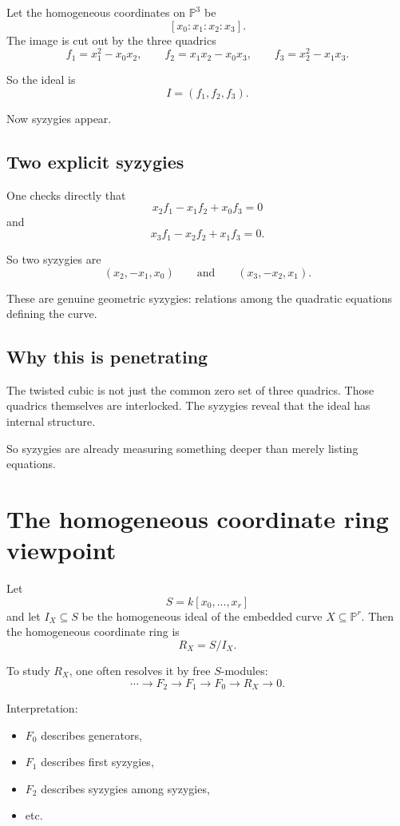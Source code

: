 \documentclass[11pt]{article}
\theoremstyle{definition}
\theoremstyle{remark}
\newcommand{\PP}{\mathbb{P}}
\begin{document}
	Let the homogeneous coordinates on \(\PP^3\) be
	\[
	[x_0:x_1:x_2:x_3].
	\]
	The image is cut out by the three quadrics
	\[
	f_1=x_1^2-x_0x_2,\qquad
	f_2=x_1x_2-x_0x_3,\qquad
	f_3=x_2^2-x_1x_3.
	\]
	
	So the ideal is
	\[
	I=(f_1,f_2,f_3).
	\]
	
	Now syzygies appear.
	
	\subsection{Two explicit syzygies}
	
	One checks directly that
	\[
	x_2f_1 - x_1f_2 + x_0f_3 = 0
	\]
	and
	\[
	x_3f_1 - x_2f_2 + x_1f_3 = 0.
	\]
	
	So two syzygies are
	\[
	(x_2,-x_1,x_0)
	\qquad\text{and}\qquad
	(x_3,-x_2,x_1).
	\]
	
	These are genuine geometric syzygies: relations among the quadratic equations defining the curve.
	
	\subsection{Why this is penetrating}
	
	The twisted cubic is not just the common zero set of three quadrics. Those quadrics themselves are interlocked. The syzygies reveal that the ideal has internal structure.
	
	So syzygies are already measuring something deeper than merely listing equations.
	
	\section{The homogeneous coordinate ring viewpoint}
	
	Let
	\[
	S=k[x_0,\dots,x_r]
	\]
	and let \(I_X\subseteq S\) be the homogeneous ideal of the embedded curve \(X\subseteq \PP^r\). Then the homogeneous coordinate ring is
	\[
	R_X=S/I_X.
	\]
	
	To study \(R_X\), one often resolves it by free \(S\)-modules:
	\[
	\cdots \to F_2 \to F_1 \to F_0 \to R_X \to 0.
	\]
	
	Interpretation:
	
	\begin{itemize}[leftmargin=2em]
		\item \(F_0\) describes generators,
		\item \(F_1\) describes first syzygies,
		\item \(F_2\) describes syzygies among syzygies,
		\item etc.
	\end{itemize}
	
\end{document}
